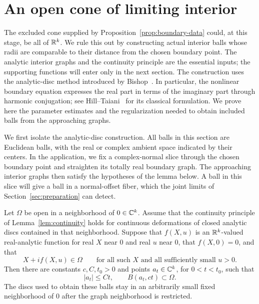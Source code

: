 \section{An open cone of limiting interior}\label{sec:noncollapse}

The excluded cone supplied by Proposition~\ref{prop:boundary-data} could,
at this stage, be all of $\mathbb R^k$.  We rule this out by constructing actual
interior balls whose radii are comparable to their distance from the chosen
boundary point.  The analytic interior graphs and the continuity principle
are the essential inputs; the supporting functions will enter only in the
next section.
The construction uses the analytic-disc method introduced by
Bishop~\cite{Bishop1965}. In particular, the nonlinear boundary equation
expresses the real part in terms of the imaginary part through harmonic
conjugation; see Hill--Taiani~\cite[Section~2, Equation~(2.1) and
Proposition~2.1, pp.~330--331]{HillTaiani1978} for its
classical formulation. We prove here the parameter estimates and the
regularization needed to obtain included balls from the approaching graphs.

We first isolate the analytic-disc construction.  All balls in this section
are Euclidean balls, with the real or complex ambient space indicated by
their centers.  In the application, we fix a complex-normal slice through
the chosen boundary point and straighten its totally real boundary graph.
The approaching interior graphs then satisfy the hypotheses of the lemma
below.  A ball in this slice will give a ball in a normal-offset fiber,
which the joint limits of Section~\ref{sec:preparation} can detect.

\begin{lemma}\label{lem:disc-family}
Let $\Omega$ be open in a neighborhood of $0\in\mathbb C^k$.  Assume that the
continuity principle of Lemma~\ref{lem:continuity} holds for continuous
deformations of closed analytic discs contained in that neighborhood.
Suppose that $f(X,u)$ is an $\mathbb R^k$-valued real-analytic function for real
$X$ near $0$ and real $u$ near $0$, that $f(X,0)=0$, and that
\[
 X+i f(X,u)\in\Omega
 \qquad\text{for all such $X$ and all sufficiently small $u>0$.}
\]
Then there are constants $c,C,t_0>0$ and points $a_t\in\mathbb C^k$, for
$0<t<t_0$, such that
\begin{equation}\label{eq:disc-balls}
 |a_t|\le Ct,
 \qquad B(a_t,ct)\subset\Omega.
\end{equation}
The discs used to obtain these balls stay in an arbitrarily small fixed
neighborhood of $0$ after the graph neighborhood is restricted.
\end{lemma}

